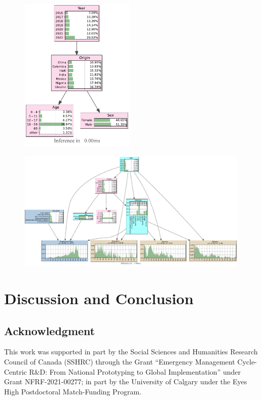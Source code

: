 \documentclass[conference]{IEEEtran}
\begin{document}
	\begin{figure}[!htb]
		\begin{center}
			\includegraphics[clip, trim= 0 0 0 0, width=0.49\textwidth]{fig/bn_refugee.pdf}
			\caption{}
			\label{fig:4}
		\end{center}
	\end{figure}
	
	\begin{figure}[!htb]
		\begin{center}
			\includegraphics[clip, trim= 0 0 0 0, width=0.99\textwidth]{fig/bn_refugee+pr+edu.pdf}
			\caption{}
			\label{fig:5}
		\end{center}
	\end{figure}
	
	
	\section{Discussion and Conclusion}
	
	
	\subsection*{Acknowledgment}
	
	\begin{small}
		This work was supported in part by the Social Sciences and Humanities Research Council of Canada (SSHRC) through the Grant ``Emergency Management Cycle-Centric R\&D: From National Prototyping to Global Implementation'' under Grant NFRF-2021-00277; in part by the University of Calgary under the Eyes High Postdoctoral Match-Funding Program.
	\end{small}
	
	
	{\small
		
		
	}
	
\end{document}

